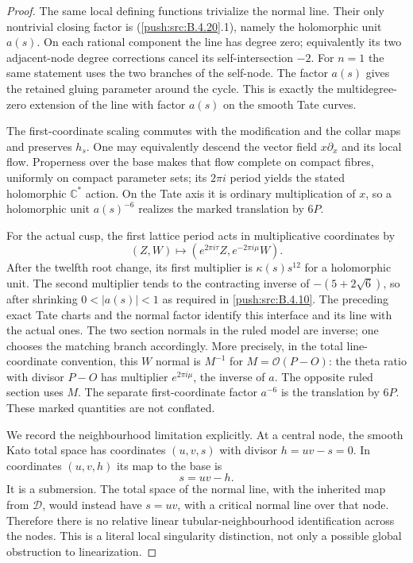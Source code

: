 \begin{proof}
The same local defining functions trivialize the
normal line. Their only nontrivial closing factor
is (\ref{push:src:B.4.20}.1), namely the holomorphic unit $a(s)$.
On each rational component the line has degree
zero; equivalently its two adjacent-node degree
corrections cancel its self-intersection $-2$.
For $n=1$ the same statement uses the two branches
of the self-node. The factor $a(s)$ gives the
retained gluing parameter around the cycle.
This is exactly the multidegree-zero extension
of the line with factor $a(s)$ on the smooth
Tate curves.

The first-coordinate scaling commutes with the
modification and the collar maps and preserves
$h_s$. One may equivalently descend the vector
field $x\partial_x$ and its local flow. Properness
over the base makes that flow complete on compact
fibres, uniformly on compact parameter sets;
its $2\pi i$ period yields the stated holomorphic
$\mathbb C^*$ action. On the Tate axis it is
ordinary multiplication of $x$, so a holomorphic
unit $a(s)^{-6}$ realizes the marked translation
by $6P$.

For the actual cusp, the first lattice period
acts in multiplicative coordinates by
\[
 (Z,W)\longmapsto
       (e^{2\pi i\tau}Z,e^{-2\pi i\mu}W).
\]
After the twelfth root change, its first multiplier
is $\kappa(s)s^{12}$ for a holomorphic unit.
The second multiplier tends to the contracting
inverse of $-(5+2\sqrt6)$, so after shrinking
$0<|a(s)|<1$ as required in \ref{push:src:B.4.10}.
The preceding exact Tate charts and the normal
factor identify this interface and its line with
the actual ones. The two section normals in the
ruled model are inverse; one chooses the matching
branch accordingly. More precisely, in the total
line-coordinate convention, this $W$ normal is
$M^{-1}$ for $M=\mathcal O(P-O)$: the theta ratio
with divisor $P-O$ has multiplier $e^{2\pi i\mu}$,
the inverse of $a$. The opposite ruled section
uses $M$. The separate first-coordinate factor
$a^{-6}$ is the translation by $6P$.
These marked quantities are not conflated.

We record the neighbourhood limitation explicitly.
At a central node, the smooth Kato total space
has coordinates $(u,v,s)$ with divisor
$h=uv-s=0$. In coordinates $(u,v,h)$ its map to
the base is
\[
 s=uv-h.
 \tag{B.4.20.2}
\]
It is a submersion. The total space of the normal
line, with the inherited map from $\mathcal D$,
would instead have $s=uv$, with a critical normal
line over that node. Therefore there is no
relative linear tubular-neighbourhood identification
across the nodes. This is a literal local
singularity distinction, not only a possible
global obstruction to linearization.


\end{proof}
